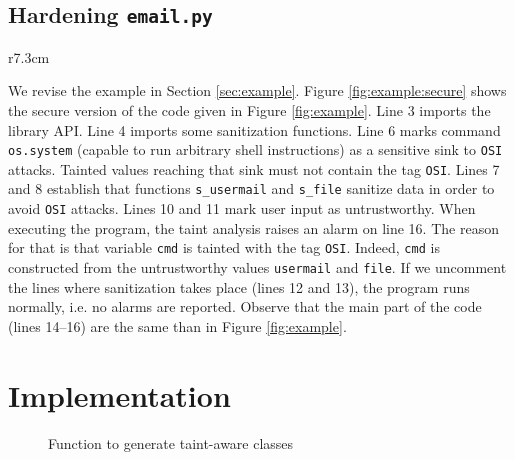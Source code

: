 \documentclass[oribibl]{llncs}
\newcommand{\nametklass}{taint-aware }
\begin{document}
\subsection{Hardening \texttt{email.py}}
\label{sec:secure:email}

\begin{wrapfigure}{r}{7.3cm}
\vspace{-30pt}
{\small{

\caption{\label{fig:example:secure} Secure version of module \texttt{email.py} }
\vspace{-10pt}
}}
\end{wrapfigure}

We revise the example in Section \ref{sec:example}. 
Figure \ref{fig:example:secure} shows the secure version of the code given 
in Figure \ref{fig:example}. 
Line 3 imports the library API. 
Line 4 imports some sanitization functions. 
Line 6 marks command \texttt{os.system} (capable
to run arbitrary shell instructions) as a
sensitive sink to \texttt{OSI} attacks.
Tainted values reaching that sink must 
not contain the tag \texttt{OSI}.
%
Lines 7 and 8 establish 
that 
functions \texttt{s\_usermail} and \texttt{s\_file}
sanitize data in order to avoid \texttt{OSI}
attacks.
Lines 10 and 11 mark user input as untrustworthy.
When executing the program, the taint analysis  
raises an alarm on line 16.
The reason for that is that 
variable \texttt{cmd} is tainted with the tag \texttt{OSI}. 
Indeed, \texttt{cmd} is constructed from the untrustworthy values 
\texttt{usermail} and \texttt{file}. 
If we uncomment the lines where sanitization 
takes place (lines 12 and 13), the program runs normally, i.e. no
alarms are reported. 
Observe that the main part of the code (lines 14--16)  
are the same than in Figure \ref{fig:example}. 

\section{Implementation}
\label{sec:implementation}
\begin{figure}[t]
{\small{

\caption{\label{fig:generate} Function to generate \nametklass classes}
}}
\end{figure}
\end{document}
